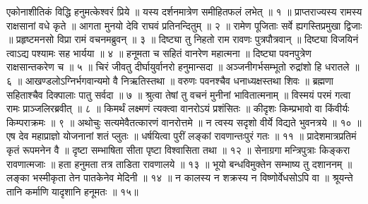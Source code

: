 एकोनाशीतिकं विद्धि हनुमत्केश्वरं प्रिये ॥
यस्य दर्शनमात्रेण समीहितफलं लभेत् ॥ १ ॥
प्राप्तराज्यस्य रामस्य राक्षसानां वधे कृते ॥
आगता मुनयो देवि राघवं प्रतिनन्दितुम् ॥ २ ॥
रामेण पूजिताः सर्वे ह्यगस्तिप्रमुखा द्विजाः ॥
प्रहृष्टमनसो विप्रा रामं वचनमब्रुवन् ॥ ३ ॥
दिष्ट्या तु निहतो राम रावणः पुत्रपौत्रवान् ॥
दिष्ट्या विजयिनं त्वाऽद्य पश्यामः सह भार्यया ॥ ४ ॥
हनूमता च सहितं वानरेण महात्मना ॥
दिष्ट्या पवनपुत्रेण राक्षसान्तकरेण च ॥ ५ ॥
चिरं जीवतु दीर्घायुर्वानरो हनुमान्सदा ॥
अञ्जनीगर्भसम्भूतो रुद्रांशो हि धरातले ॥ ६ ॥
आखण्डलोऽग्निर्भगवान्यमो वै निऋतिस्तथा ॥
वरुणः पवनश्चैव धनाध्यक्षस्तथा शिवः ॥
ब्रह्मणा सहिताश्चैव दिक्पालाः पातु सर्वदा ॥ ७ ॥
श्रुत्वा तेषां तु वचनं मुनीनां भावितात्मनाम् ॥
विस्मयं परमं गत्वा रामः प्राञ्जलिरब्रवीत् ॥ ८ ॥
किमर्थं लक्ष्मणं त्यक्त्वा वानरोऽयं प्रशंसितः ॥
कीदृशः किम्प्रभावो वा किंवीर्यः किम्पराक्रमः ॥ ९ ॥
अथोचुः सत्यमेवैतत्कारणं वानरोत्तमे ॥
न त्वस्य सदृशो वीर्ये विद्यते भुवनत्रये ॥ १० ॥
एष देव महाप्राज्ञो योजनानां शतं प्लुतः ॥
धर्षयित्वा पुरीं लङ्कां रावणान्तःपुरं गतः ॥ ११ ॥
प्रादेशमात्रप्रतिमं कृतं रूपमनेन वै ॥
दृष्टा सम्भाषिता सीता पृष्टा विश्वासिता तथा ॥ १२ ॥
सेनाग्रगा मन्त्रिपुत्राः किङ्करा रावणात्मजाः ॥
हता हनुमता तत्र ताडिता रावणालये ॥ १३ ॥
भूयो बन्धविमुक्तेन सम्भाष्य तु दशाननम् ॥
लङ्का भस्मीकृता तेन पातकेनेव मेदिनी ॥ १४ ॥
न कालस्य न शक्रस्य न विष्णोर्वेधसोऽपि वा ॥
श्रूयन्ते तानि कर्माणि यादृशानि हनूमतः ॥ १५॥

